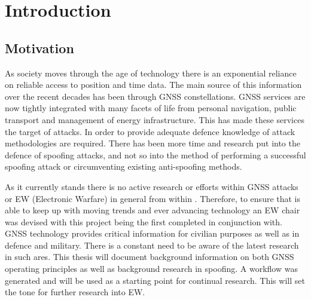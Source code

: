 
\chapter{Introduction}\label{chapter:firstchapter} %

\label{Chapter1} %

\section{Motivation}\label{sec:Motivation}


As society moves through the age of technology there is an exponential reliance on reliable access to position and time data. The main source of this information over the
recent decades has been through GNSS constellations. GNSS services are now tightly integrated with many facets of life from personal navigation, public transport and
management of energy infrastructure. This has made these services the target of attacks. 
In order to provide adequate defence knowledge of attack methodologies are
required. 
There has been more time and research put into the defence of spoofing attacks, and not so into the method of performing a successful spoofing attack or
circumventing existing anti-spoofing methods. 

As it currently stands there is no active research or efforts within GNSS attacks or EW (Electronic Warfare) in general from within \univname. Therefore, to ensure that
\univname  is able to keep up with moving trends and
ever advancing technology an EW chair was devised with this project being the first completed in conjunction with. GNSS technology provides critical information for
civilian purposes as well as in defence and military. There is a constant need to be aware of the latest research in such ares.   
This thesis will document background information on both GNSS operating principles as well as background research in
spoofing. A workflow was generated and will be used as a starting point for continual research. This will set the tone for further research into EW.

